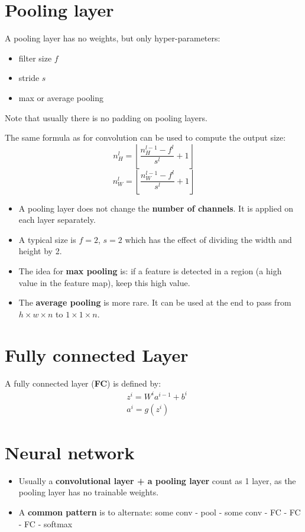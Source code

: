 \section{Pooling layer}

A pooling layer has no weights, but only hyper-parameters:
\begin{itemize}
    \item filter size $f$
    \item stride $s$
    \item max or average pooling
\end{itemize}
Note that usually there is no padding on pooling layers.

The same formula as for convolution can be used to compute the output size:
\begin{equation}
    n_H^l = \left\lfloor \frac{n_H^{l-1} - f^l}{s^l} + 1 \right\rfloor
\end{equation}
\begin{equation}
    n_W^l = \left\lfloor \frac{n_W^{l-1} - f^l}{s^l} + 1 \right\rfloor
\end{equation}
\begin{itemize}
    \item A pooling layer does not change the \textbf{number of channels}. It is applied on each layer separately.
    \item A typical size is $f=2$, $s=2$ which has the effect of dividing the width and height by 2. 
    \item The idea for \textbf{max pooling} is: if a feature is detected in a region (a high value in the feature map), keep this high value.
    \item The \textbf{average pooling} is more rare. It can be used at the end to pass from $h\times w \times n$ to $1 \times 1 \times n$.
\end{itemize}



\section{Fully connected Layer}
A fully connected layer (\textbf{FC}) is defined by:
\begin{equation}
    \begin{split}
        &z^i = W^i a^{i-1} + b^i \\
        &a^i = g(z^i)
    \end{split}
\end{equation}

\section{Neural network}
\begin{itemize}
    \item Usually a \textbf{convolutional layer + a pooling layer} count as 1 layer, as the pooling layer has no trainable weights.
    \item A \textbf{common pattern} is to alternate: some conv - pool - some conv - FC - FC - FC - softmax

\end{itemize}




